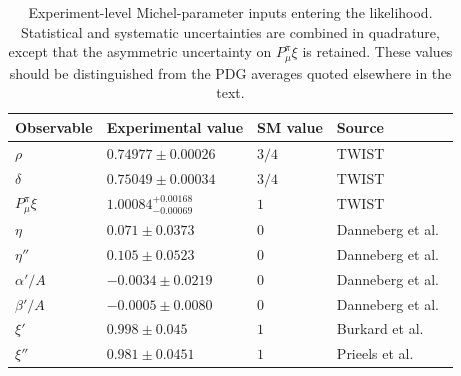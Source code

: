 \begin{table}[tbp]
    \centering
    \begin{tabular}{llll}
        \toprule
        Observable
        & Experimental value
        & SM value
        & Source
        \\
        \midrule
        $\rho$
        & $0.74977\pm0.00026$
        & $3/4$
        & TWIST \cite{Hillairet2012precision}
        \\
        $\delta$
        & $0.75049\pm0.00034$
        & $3/4$
        & TWIST \cite{Hillairet2012precision}
        \\
        $P_\mu^\pi\xi$
        & $1.00084^{+0.00168}_{-0.00069}$
        & $1$
        & TWIST \cite{bueno2011precise}
        \\
        $\eta$
        & $0.071\pm0.0373$
        & $0$
        & Danneberg et al.\ \parencite{danneberg2005muon}
        \\
        $\eta''$
        & $0.105\pm0.0523$
        & $0$
        & Danneberg et al.\ \parencite{danneberg2005muon}
        \\
        $\alpha'/A$
        & $-0.0034\pm0.0219$
        & $0$
        & Danneberg et al.\ \parencite{danneberg2005muon}
        \\
        $\beta'/A$
        & $-0.0005\pm0.0080$
        & $0$
        & Danneberg et al.\ \parencite{danneberg2005muon}
        \\
        $\xi'$
        & $0.998\pm0.045$
        & $1$
        & Burkard et al.\ \parencite{burkard1985muon}
        \\
        $\xi''$
        & $0.981\pm0.0451$
        & $1$
        & Prieels et al.\ \parencite{prieels2014measurement}
        \\
        \bottomrule
    \end{tabular}
    \caption{%
        Experiment-level Michel-parameter inputs entering the likelihood.
        Statistical and systematic uncertainties are combined in quadrature,
        except that the asymmetric uncertainty on $P_\mu^\pi\xi$ is retained.
        These values should be distinguished from the PDG averages quoted
        elsewhere in the text.
    }
    \label{tab:michel-likelihood-inputs}
\end{table}